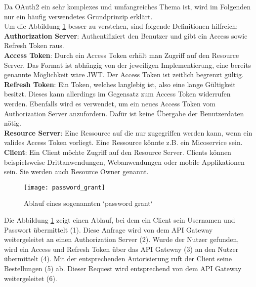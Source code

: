 Da OAuth2 ein sehr komplexes und umfangreiches Thema ist, wird im Folgenden nur ein häufig verwendetes Grundprinzip erklärt. \\

Um die Abbildung \ref{fig:password_grant} besser zu verstehen, sind folgende Definitionen hilfreich:\cite{richardson2019mic_pattern}\\

\textbf{Authorization Server}: Authentifiziert den Benutzer und gibt ein Access sowie Refresh Token raus.\\

\textbf{Access Token}: Durch ein Access Token erhält man Zugriff auf den Resource Server. Das Format ist abhängig von der jeweiligen Implementierung, eine bereits genannte Möglichkeit wäre JWT. Der Access Token ist zeitlich begrenzt gültig. \\

\textbf{Refresh Token}: Ein Token, welches langlebig ist, also eine lange Gültigkeit besitzt. Dieses kann allerdings im Gegensatz zum Access Token widerrufen werden. Ebenfalls wird es verwendet, um ein neues Access Token vom Authorization Server anzufordern. Dafür ist keine Übergabe der Benutzerdaten nötig.\\ 

\textbf{Resource Server}: Eine Ressource auf die nur zugegriffen werden kann, wenn ein valides Access Token vorliegt. Eine Ressource könnte z.B. ein Micoservice sein.\\ 

\textbf{Client}: Ein Client möchte Zugriff auf den Resource Server. Clients können beispielsweise Drittanwendungen, Webanwendungen oder mobile Applikationen sein. Sie werden auch Resource Owner genannt. \\ 

\begin{figure}[H]
	\centering
	\texttt{[image: password\_grant]}
	\caption[Ablauf eines password grants] { Ablauf eines sogenannten `password grant`\cite{richardson2019mic_pattern} }
	\label{fig:password_grant}
\end{figure}

Die Abbildung \ref{fig:password_grant} zeigt einen Ablauf, bei dem ein Client sein Usernamen und Passwort übermittelt (1). Diese Anfrage wird von dem API Gateway weitergeleitet an einen Authorization Server (2). Wurde der Nutzer gefunden, wird ein Access und Refresh Token über das API Gateway (3) an den Nutzer übermittelt (4). Mit der entsprechenden Autorisierung ruft der Client seine Bestellungen (5) ab. Dieser Request wird entsprechend von dem API Gateway weitergeleitet (6). \\

